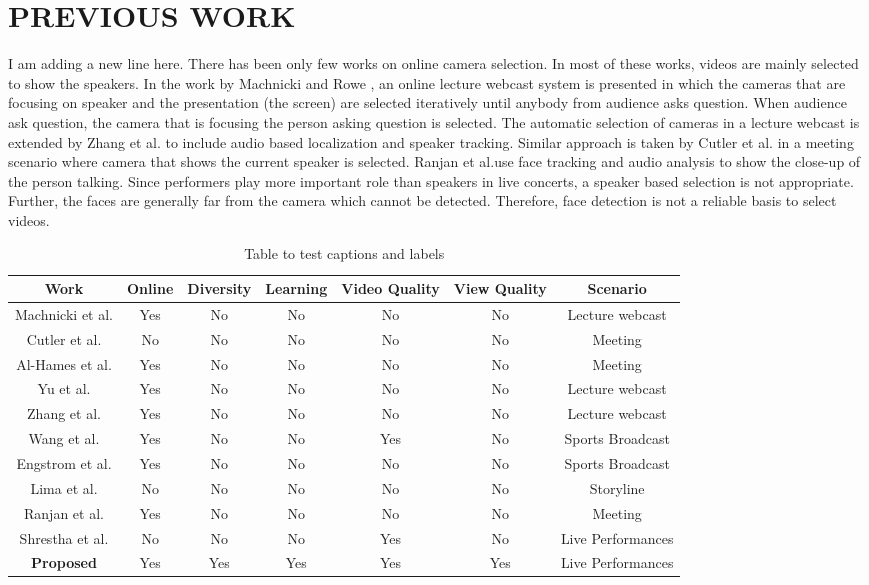 \documentclass{new}
\begin{document}
\section{ PREVIOUS WORK}
I am adding a new line here.
There has been only few works on online camera selection. In
most of these works, videos are mainly selected to show the speakers.
In the work by Machnicki and Rowe \cite{rfc9}, an online lecture
webcast system is presented in which the cameras that are focusing
on speaker and the presentation (the screen) are selected iteratively
until anybody from audience asks question. When audience ask
question, the camera that is focusing the person asking question is
selected. The automatic selection of cameras in a lecture webcast
is extended by Zhang et al. \cite{rfc21} to include audio based localization
and speaker tracking. Similar approach is taken by Cutler et al.\cite{rfc6} in a meeting scenario where camera that shows the current speaker
is selected. Ranjan et al.use face tracking and audio analysis
to show the close-up of the person talking. Since performers
play more important role than speakers in live concerts, a speaker
based selection is not appropriate. Further, the faces are generally
far from the camera which cannot be detected. Therefore, face detection
is not a reliable basis to select videos.
\begin{table}[h!]
\centering
\caption{Table to test captions and labels}
\begin{tabular}{c | c | c | c | c | c | c } 
 \hline
 Work & Online  & Diversity & Learning & Video Quality & View Quality & Scenario\\ [0.5ex] 
 \hline
 Machnicki et al. \cite{rfc9} & Yes & No & No & No & No & Lecture webcast \\ 
 \hline
 Cutler et al. \cite{rfc6} &  No & No & No & No & No & Meeting \\
 \hline
 Al-Hames et al. \cite{rfc3} & Yes & No & No & No & No & Meeting \\
 \hline
 Yu et al. \cite{rfc20} & Yes & No & No & No & No & Lecture webcast\\
 \hline
 Zhang et al. \cite{rfc21} & Yes & No & No & No & No & Lecture webcast \\ 
 \hline
 Wang et al. \cite{rfc16} & Yes & No & No & Yes & No & Sports Broadcast \\
 \hline
 Engstrom et al. \cite{rfc18} &  Yes & No & No & No & No & Sports Broadcast\\
 \hline
 Lima et al. \cite{rfc7} & No & No & No & No & No & Storyline\\
 \hline
 Ranjan et al. \cite{rfc12} &  Yes & No & No & No & No & Meeting \\
 \hline
 Shrestha et al. \cite{rfc15} &  No & No & No & Yes & No & Live Performances \\
 \hline
 \textbf{Proposed} & Yes & Yes & Yes & Yes & Yes & Live Performances  \\[1ex] 
 \hline
\end{tabular}

\end{table}
\end{document}
